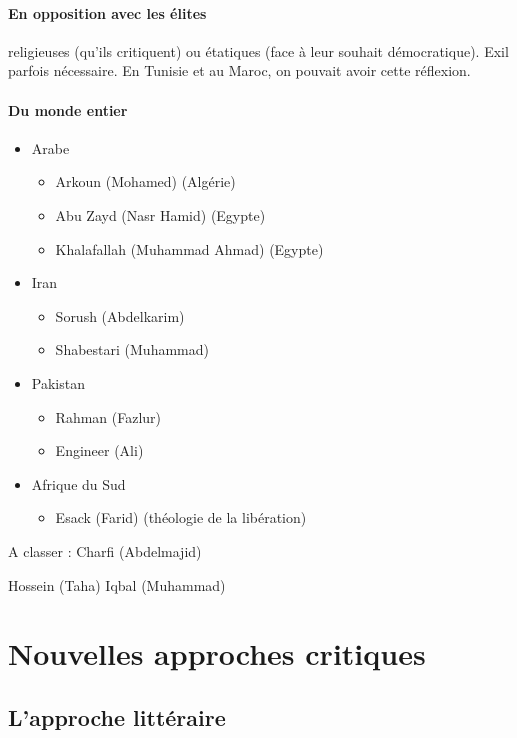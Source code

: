 \paragraph{En opposition avec les élites} religieuses (qu'ils critiquent) ou étatiques (face à leur souhait démocratique). Exil parfois nécessaire. En Tunisie et au Maroc, on pouvait avoir cette réflexion.

\paragraph{Du monde entier} 
\begin{itemize}
    \item Arabe
\begin{itemize} 
    \item Arkoun (Mohamed) (Algérie)
    \item Abu Zayd (Nasr Hamid) (Egypte)
    \item Khalafallah (Muhammad Ahmad) (Egypte)
\end{itemize}
\item Iran
\begin{itemize} 
    \item Sorush (Abdelkarim)
    \item Shabestari (Muhammad)
\end{itemize}
\item Pakistan
\begin{itemize} 
    \item Rahman (Fazlur)
    \item Engineer (Ali)
\end{itemize}
\item Afrique du Sud
\begin{itemize} 
    \item Esack (Farid) (théologie de la libération)
\end{itemize}
\end{itemize}
A classer : 
   Charfi
(Abdelmajid) 

 Hossein (Taha) Iqbal (Muhammad)

 

 
  
\section{Nouvelles approches critiques}

\subsection{L’approche littéraire}


